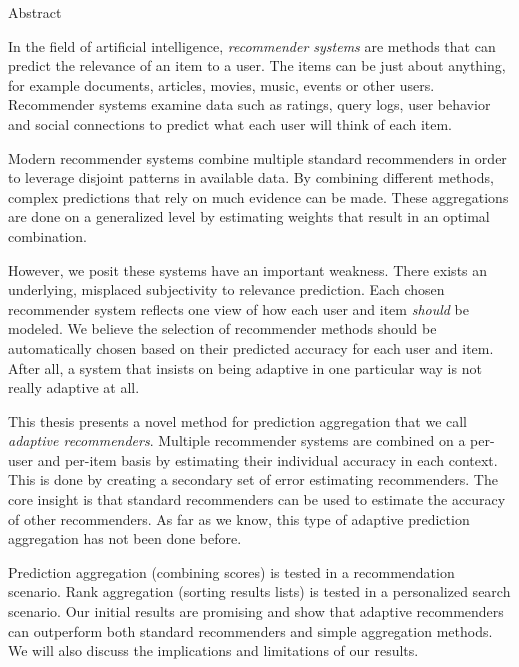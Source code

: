 \null\vspace{4em}
{
  \centering
  \normalfont
  \huge
  \noindent
  Abstract\\
}
\vspace{2em}

\noindent
In the field of artificial intelligence,
\emph{recommender systems} are methods
that can predict the relevance of an item to a user.
The items can be just about anything, for example 
documents, articles, movies, music, events or other users.
Recommender systems examine data such as ratings, query logs,
user behavior and social connections to predict
what each user will think of each item.

Modern recommender systems
combine multiple standard recommenders
in order to leverage disjoint patterns in available data.
By combining different methods,
complex predictions that rely on much evidence can be made.
These aggregations are done on a generalized level
by estimating weights that result in an optimal combination.

However, we posit these systems have an important weakness.
There exists an underlying, misplaced subjectivity to relevance prediction.
Each chosen recommender system reflects one view of 
how each user and item \emph{should} be modeled.
We believe the selection of recommender methods should 
be automatically chosen based on their predicted accuracy for each user and item.
After all, a system that insists on being adaptive
in one particular way is not really adaptive at all.

This thesis presents a novel method for prediction aggregation
that we call \emph{adaptive recommenders}.
Multiple recommender systems are combined on a per-user and per-item basis
by estimating their individual accuracy in each context.
This is done by creating a secondary set of error estimating recommenders.
The core insight is that standard recommenders can be used
to estimate the accuracy of other recommenders.
As far as we know, this type of adaptive prediction aggregation
has not been done before.

Prediction aggregation (combining scores) is tested in a recommendation scenario.
Rank aggregation (sorting results lists) is tested in a personalized search scenario.
Our initial results are promising and show that adaptive recommenders
can outperform both standard recommenders and simple aggregation methods.
We will also discuss the implications and limitations of our results.

\cleardoublepage
